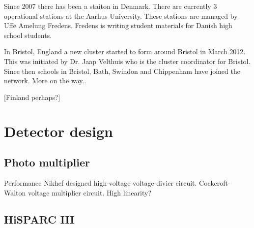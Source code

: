 Since 2007 there has been a \hisparc staiton in
Denmark. There are currently 3 operational stations at the Aarhus
University. These stations are managed by Uffe Amelung Fredens.
Fredens is writing student materials for Danish high school students.

In Bristol, England a new cluster started to form around Bristol in
March 2012. This was initiated by Dr. Jaap Velthuis who is the cluster
coordinator for Bristol. Since then schools in Bristol, Bath, Swindon
and Chippenham have joined the network. More on the way..

[Finland perhaps?]


\section{Detector design}

\subsection{Photo multiplier}

Performance
Nikhef designed high-voltage voltage-divier circuit.
Cockcroft-Walton voltage multiplier circuit.
High linearity?


\subsection{HiSPARC III}
